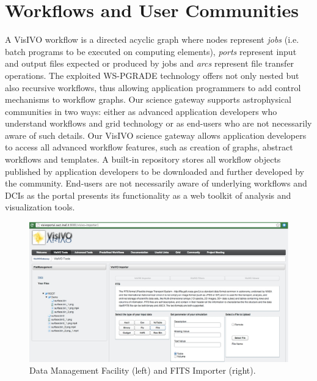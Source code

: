 \section{Workflows and User Communities}
A VisIVO workflow is a directed acyclic graph where nodes represent \emph{jobs} (i.e. batch programs to be executed on computing elements),  \emph{ports} represent input and output files expected or produced by jobs and \emph{arcs} represent file transfer operations. The exploited WS-PGRADE technology offers not only nested but also recursive workflows, thus allowing application programmers to add control mechanisms to workflow graphs. Our science gateway supports astrophysical communities in two ways: either as advanced application developers who understand workflows and grid technology or as end-users who are not necessarily aware of such details. Our VisIVO science gateway allows application developers to access all advanced workflow features, such as creation of graphs, abstract workflows and templates. A built-in repository stores all workflow objects published by application developers to be downloaded and further developed by the community. End-users are not necessarily aware of underlying workflows and DCIs as the portal presents its functionality as a web toolkit of analysis and visualization tools. 

\begin{figure}
\begin{center}
\includegraphics[width=1\textwidth]{part5/Costa_O08/O08_f1.eps} 
\caption{Data Management Facility (left) and FITS Importer (right).}\label{fg2}
\end{center}
\end{figure}


